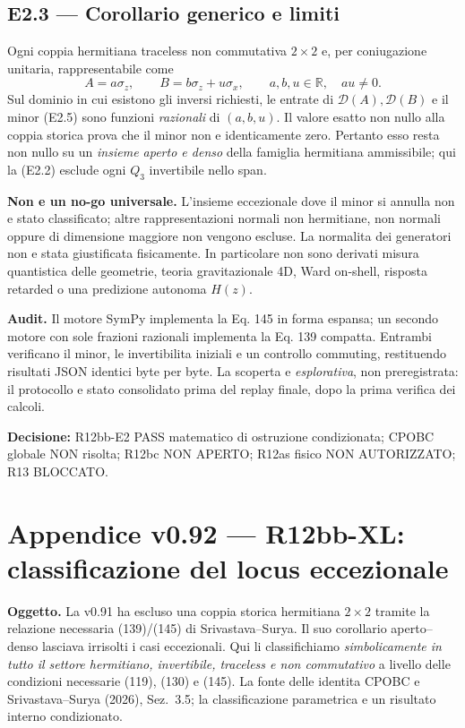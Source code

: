 \documentclass[11pt,a4paper]{article}
\begin{document}
\clearpage
\subsection*{E2.3 --- Corollario generico e limiti}
Ogni coppia hermitiana traceless non commutativa $2\times2$ e, per coniugazione unitaria, rappresentabile come
\begin{equation}
 A=a\sigma_z,\qquad B=b\sigma_z+u\sigma_x,\qquad a,b,u\in\mathbb R,\quad au\ne0.\tag{E2.6}
\end{equation}
Sul dominio in cui esistono gli inversi richiesti, le entrate di $\mathcal D(A),\mathcal D(B)$ e il minor (E2.5) sono funzioni \emph{razionali} di $(a,b,u)$. Il valore esatto non nullo alla coppia storica prova che il minor non e identicamente zero. Pertanto esso resta non nullo su un \emph{insieme aperto e denso} della famiglia hermitiana ammissibile; qui la (E2.2) esclude ogni $Q_3$ invertibile nello span.

\textbf{Non e un no-go universale.} L'insieme eccezionale dove il minor si annulla non e stato classificato; altre rappresentazioni normali non hermitiane, non normali oppure di dimensione maggiore non vengono escluse. La normalita dei generatori non e stata giustificata fisicamente. In particolare non sono derivati misura quantistica delle geometrie, teoria gravitazionale 4D, Ward on-shell, risposta retarded o una predizione autonoma $H(z)$.

\textbf{Audit.} Il motore SymPy implementa la Eq. 145 in forma espansa; un secondo motore con sole frazioni razionali implementa la Eq. 139 compatta. Entrambi verificano il minor, le invertibilita iniziali e un controllo commuting, restituendo risultati JSON identici byte per byte. La scoperta e \emph{esplorativa}, non preregistrata: il protocollo e stato consolidato prima del replay finale, dopo la prima verifica dei calcoli.

\textbf{Decisione:} \textsf{R12bb-E2 PASS matematico di ostruzione condizionata; CPOBC globale NON risolta; R12bc NON APERTO; R12as fisico NON AUTORIZZATO; R13 BLOCCATO.}

\clearpage
\begingroup
\setlength{\parskip}{0.16em}
\section*{Appendice v0.92 --- R12bb-XL: classificazione del locus eccezionale}
\textbf{Oggetto.} La v0.91 ha escluso una coppia storica hermitiana $2\times2$ tramite la relazione necessaria (139)/(145) di Srivastava--Surya. Il suo corollario aperto--denso lasciava irrisolti i casi eccezionali. Qui li classifichiamo \emph{simbolicamente in tutto il settore hermitiano, invertibile, traceless e non commutativo} a livello delle condizioni necessarie (119), (130) e (145). La fonte delle identita CPOBC e Srivastava--Surya (2026), Sez.~3.5; la classificazione parametrica e un risultato interno condizionato.
\end{document}
